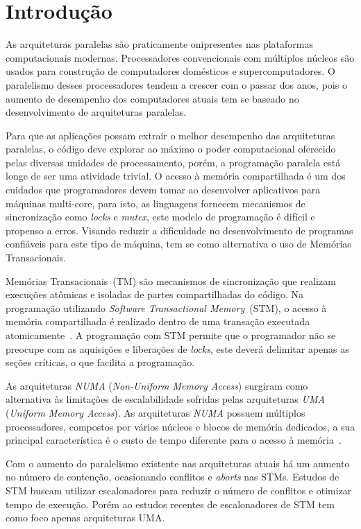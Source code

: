 \documentclass[ti]{texufpel}
\begin{document}
\tableofcontents

\chapter{Introdução}

As arquiteturas paralelas são praticamente onipresentes nas plataformas computacionais modernas. Processadores convencionais com múltiplos núcleos são usados para construção de computadores domésticos e supercomputadores. O paralelismo desses processadores tendem a crescer com o passar dos anos, pois o aumento de desempenho dos computadores atuais tem se baseado no desenvolvimento de arquiteturas paralelas.

Para que as aplicações possam extrair o melhor desempenho das arquiteturas paralelas, o código deve explorar ao máximo o poder computacional oferecido pelas diversas unidades de processamento, porém, a programação paralela está longe de ser uma atividade trivial. O acesso à memória compartilhada é um dos cuidados que programadores devem tomar ao desenvolver aplicativos para máquinas multi-core, para isto, as linguagens fornecem mecanismos de sincronização como \emph{locks} e \emph{mutex}, este modelo de programação é difícil e propenso a erros. Visando reduzir a dificuldade no desenvolvimento de programas confiáveis para este tipo de máquina, tem se como alternativa o uso de Memórias Transacionais.

Memórias Transacionais~(TM) são mecanismos de sincronização que realizam execuções atômicas e isoladas de partes compartilhadas do código. Na programação utilizando \emph{Software Transactional Memory}~(STM), o acesso à memória compartilhada é realizado dentro de uma transação executada atomicamente~\cite{teixeira15}. A programação com STM permite que o programador não se preocupe com as aquisições e liberações de \emph{locks}, este deverá delimitar apenas as seções críticas, o que facilita a programação.

As arquiteturas \emph{NUMA} (\emph{Non-Uniform Memory Access}) surgiram como alternativa às limitações de escalabilidade sofridas pelas arquiteturas \emph{UMA} (\emph{Uniform Memory Access}). As arquiteturas \emph{NUMA} possuem múltiplos processadores, compostos por vários núcleos e blocos de memória dedicados, a sua principal característica é o custo de tempo diferente para o acesso à memória~\cite{rodolfo14}.

Com o aumento do paralelismo existente nas arquiteturas atuais há um aumento no número de contenção, ocasionando conflitos e \emph{aborts} nas STMs. Estudos de STM buscam utilizar escalonadores para reduzir o número de conflitos e otimizar tempo de execução. Porém ao estudos recentes de escalonadores de STM tem como foco apenas arquiteturas UMA.
\end{document}

